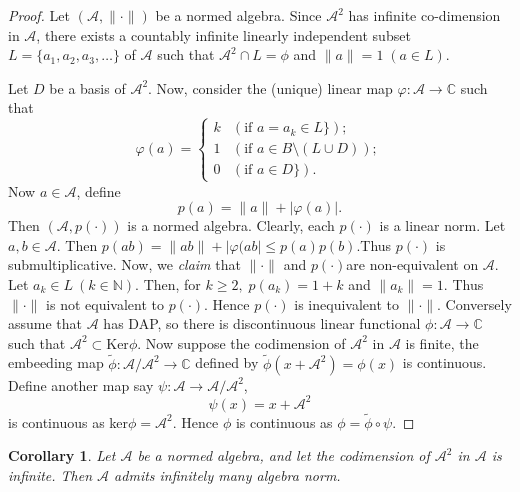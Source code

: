 \documentclass{amsart}
\newtheorem{cor}[thm]{Corollary}
\theoremstyle{definition}
\numberwithin{equation}{section}
\begin{document}
\begin{proof}
	Let $(\mathcal{A}, \| \cdot \|)$ be a normed algebra. Since $\mathcal{A}^2$ has infinite co-dimension in $\mathcal{A}$, there exists a countably infinite linearly independent subset $L = \{a_1, a_2,a_3, \ldots\}$ of $\mathcal{A}$ such that $\mathcal{A}^2 \cap L = \phi$ and $\| a \| =1 \; (a \in L)$. 
	
	Let $D$ be a basis of $\mathcal{A}^2$. Now, consider the (unique) linear map $\varphi : \mathcal{A} \longrightarrow \mathbb{C}$ such that
	\[
	\varphi(a)=
	\begin{cases}
		k&  (\text{if } a=a_{k}  \in L \});\\
		1 & (\text{if } a \in B \setminus (L \cup D)); \\
		0 & (\text{if } a \in D \}).
	\end{cases}
	\]
	Now $a \in \mathcal{A}$, define
	$$p(a)=\|a\|+ |\varphi(a)|.$$
	Then $(\mathcal{A}, p( \cdot ))$ is a normed algebra.
	Clearly, each $p(\cdot)$ is a linear norm. Let $a, b \in \mathcal{A}$. Then $p(ab)  = \|ab\| + |\varphi(ab| \leq p(a)p(b)$.Thus $p(\cdot)$ is submultiplicative. Now, we \textit{claim} that $\| \cdot \|$ and $p(\cdot)$are non-equivalent on $\mathcal{A}$. Let $a_{k} \in L \ (k \in \mathbb{N})$. Then, for $k \geq 2, \; p(a_k) = 1+k$ and $\|a_k\| = 1$. Thus $\| \cdot \|$ is not equivalent to $p(\cdot)$. Hence $p(\cdot)$ is inequivalent to $\| \cdot \|$.
	Conversely assume that $\mathcal{A}$ has DAP, so there is discontinuous linear functional $\phi: \mathcal{A} \longrightarrow \mathbb{C}$ such that $\mathcal{A}^2 \subset \text{Ker} \phi$. Now suppose the codimension of $\mathcal{A}^2$ in $\mathcal{A}$ is finite, the embeeding map $\tilde{\phi}: \mathcal{A}/ \mathcal{A}^2 \longrightarrow \mathbb{C}$ defined by $\tilde{\phi}(x+ \mathcal{A}^2)= \phi(x)$ is continuous. Define another map say $\psi: \mathcal{A} \longrightarrow \mathcal{A}/\mathcal{A}^2$, $$\psi(x)= x+ \mathcal{A}^2$$ is continuous as ker$\phi= \mathcal{A}^2$. Hence $\phi$ is continuous as $\phi= \tilde{\phi} \circ \psi$.
\end{proof}
 
 \begin{cor}{\label{Infinitely Many Norms}}
 	Let $\mathcal{A}$ be a normed algebra, and let the codimension of $\mathcal{A}^2$ in  $\mathcal{A}$ is infinite. Then $\mathcal{A}$ admits infinitely many algebra norm.
 \end{cor}
 
\end{document}
